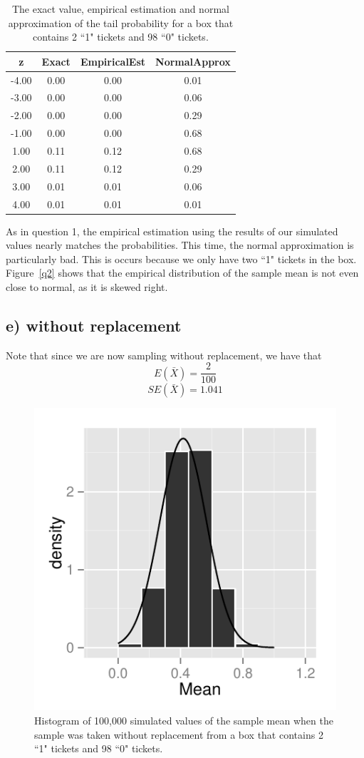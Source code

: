 \documentclass[11pt]{article}
\begin{document}
\begin{table}[H]
\centering
\begin{tabular}{|c|ccc|}
  \hline
z & Exact & EmpiricalEst & NormalApprox \\ 
  \hline
-4.00 & 0.00 & 0.00 & 0.01 \\ 
  -3.00 & 0.00 & 0.00 & 0.06 \\ 
  -2.00 & 0.00 & 0.00 & 0.29 \\ 
  -1.00 & 0.00 & 0.00 & 0.68 \\ 
  1.00 & 0.11 & 0.12 & 0.68 \\ 
  2.00 & 0.11 & 0.12 & 0.29 \\ 
  3.00 & 0.01 & 0.01 & 0.06 \\ 
  4.00 & 0.01 & 0.01 & 0.01 \\ 
   \hline
\end{tabular}
\caption{The exact value, empirical estimation and normal approximation of the tail probability for a box that contains 2 ``1" tickets and 98 ``0" tickets.} 
\end{table}

\noindent As in question 1, the empirical estimation using the results of our simulated values nearly matches the probabilities. This time, the normal approximation is particularly bad. This is occurs because we only have two ``1" tickets in the box.  Figure~\ref{q2} shows that the empirical distribution of the sample mean is not even close to normal, as it is skewed right.  


\subsection*{e) without replacement}


\noindent Note that since we are now sampling without replacement, we have that
$$E(\bar{X})= \frac{2}{100}$$ 
$$SE(\bar{X}) = 1.041$$


\begin{figure}[H]
\centering
\includegraphics[width = .5\textwidth]{histogram_1e-1.pdf}
\caption{Histogram of 100,000 simulated values of the sample mean when the sample was taken without replacement from  a box that contains 2 ``1" tickets and 98 ``0" tickets.}
\end{figure}
\end{document}
